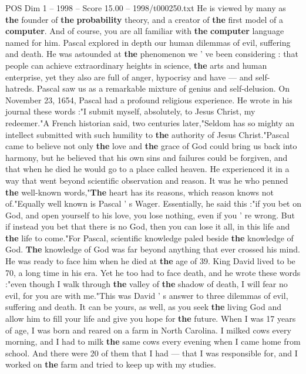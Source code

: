 \begin{textsample}{POS Dim 1 – 1998 – Score 15.00 – 1998/t000250.txt}
He is viewed by many as \textbf{the} founder of \textbf{the} \textbf{probability} theory, and a creator of \textbf{the} first model of a \textbf{computer}.
And of course, you are all familiar with \textbf{the} \textbf{computer} language named for him.
Pascal explored in depth our human dilemmas of evil, suffering and death.
He was astounded at \textbf{the} phenomenon we ' ve been considering : that people can achieve extraordinary heights in science, \textbf{the} arts and human enterprise, yet they also are full of anger, hypocrisy and have — and self- hatreds.
Pascal saw us as a remarkable mixture of genius and self-delusion.
On November 23, 1654, Pascal had a profound religious experience.
He wrote in his journal these words :"I submit myself, absolutely, to Jesus Christ, my redeemer."A French historian said, two centuries later,"Seldom has so mighty an intellect submitted with such humility to \textbf{the} authority of Jesus Christ."Pascal came to believe not only \textbf{the} love and \textbf{the} grace of God could bring us back into harmony, but he believed that his own sins and failures could be forgiven, and that when he died he would go to a place called heaven.
He experienced it in a way that went beyond scientific observation and reason.
It was he who penned \textbf{the} well-known words,"\textbf{The} heart has its reasons, which reason knows not of."Equally well known is Pascal ' s Wager.
Essentially, he said this :"if you bet on God, and open yourself to his love, you lose nothing, even if you ' re wrong.
But if instead you bet that there is no God, then you can lose it all, in this life and \textbf{the} life to come."For Pascal, scientific knowledge paled beside \textbf{the} knowledge of God. \textbf{The} knowledge of God was far beyond anything that ever crossed his mind.
He was ready to face him when he died at \textbf{the} age of 39.
King David lived to be 70, a long time in his era.
Yet he too had to face death, and he wrote these words :"even though I walk through \textbf{the} valley of \textbf{the} shadow of death, I will fear no evil, for you are with me."This was David ' s answer to three dilemmas of evil, suffering and death.
It can be yours, as well, as you seek \textbf{the} living God and allow him to fill your life and give you hope for \textbf{the} future.
When I was 17 years of age, I was born and reared on a farm in North Carolina.
I milked cows every morning, and I had to milk \textbf{the} same cows every evening when I came home from school.
And there were 20 of them that I had — that I was responsible for, and I worked on \textbf{the} farm and tried to keep up with my studies.

\end{textsample}
